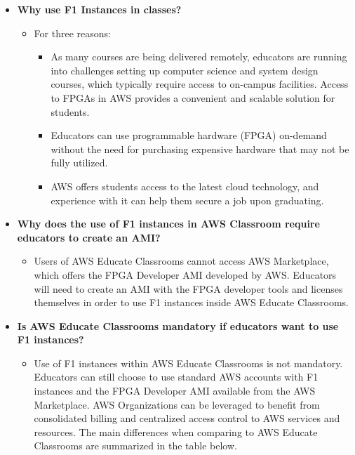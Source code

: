 \documentclass[a4paper]{article}
\begin{document}
    \begin{itemize}
        \item[\ding{42}] \textbf{Why use F1 Instances in classes?}
        \begin{itemize}
            \item[\ding{45}] For three reasons:
            \begin{itemize}
                \item As many courses are being delivered remotely, educators are running into challenges setting up computer science and system design courses, which typically require access to on-campus facilities. Access to FPGAs in AWS provides a convenient and scalable solution for students.
                
                \item Educators can use programmable hardware (FPGA) on-demand without the need for purchasing expensive hardware that may not be fully utilized.

                \item AWS offers students access to the latest cloud technology, and experience with it can help them secure a job upon graduating.
            \end{itemize}
        \end{itemize}

        \item[\ding{42}] \textbf{Why does the use of F1 instances in AWS Classroom require educators to create an AMI?}
        \begin{itemize}
            \item[\ding{45}] Users of AWS Educate Classrooms cannot access AWS Marketplace, which offers the FPGA Developer AMI developed by AWS. Educators will need to create an AMI with the FPGA developer tools and licenses themselves in order to use F1 instances inside AWS Educate Classrooms.
        \end{itemize}

        \item[\ding{42}] \textbf{Is AWS Educate Classrooms mandatory if educators want to use F1 instances?}
        \begin{itemize}
            \item[\ding{45}] Use of F1 instances within AWS Educate Classrooms is not mandatory. Educators can still choose to use standard AWS accounts with F1 instances and the FPGA Developer AMI available from the AWS Marketplace. AWS Organizations can be leveraged to benefit from consolidated billing and centralized access control to AWS services and resources. The main differences when comparing to AWS Educate Classrooms are summarized in the table below.


\end{itemize}
\end{itemize}
\end{document}
